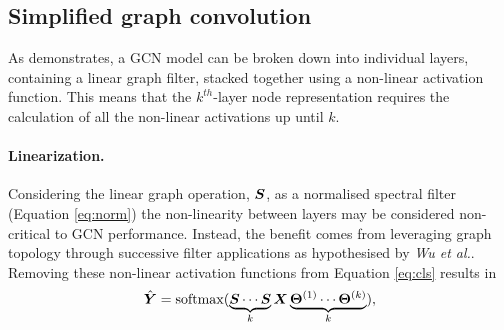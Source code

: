 %
%


\subsection{Simplified graph convolution}
\label{sec:SGC}



As  demonstrates, a GCN model can be broken down into individual layers, containing a linear graph filter, stacked together using a non-linear activation function.
This means that the $k^{th}$-layer node representation requires the calculation of all the non-linear activations up until $k$.

\paragraph{Linearization.}
Considering the linear graph operation, ${\bm{S}}$, as a normalised spectral filter (Equation \ref{eq:norm}) the non-linearity between layers may be considered non-critical to GCN performance.
Instead, the benefit comes from leveraging graph topology through successive filter applications as hypothesised by \textit{Wu et al.}.
Removing these non-linear activation functions from Equation \ref{eq:cls} results in
\begin{equation}
    \hat{{\bm{Y}}} = \operatorname{softmax}(\underbrace{{\bm{S}}\cdots{\bm{S}}}_k{\bm{X}}\underbrace{\bm{\Theta}^{(1)}\cdots\bm{\Theta}^{(k)}}_k),
\end{equation}

